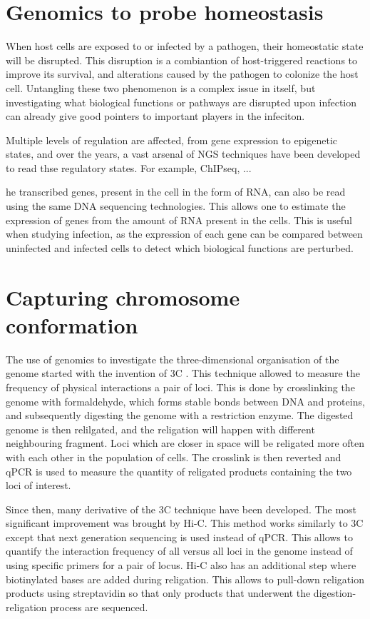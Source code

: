 \section{Genomics to probe homeostasis}

When host cells are exposed to or infected by a pathogen, their homeostatic state will be disrupted. This disruption is a combiantion of host-triggered reactions to improve its survival, and alterations caused by the pathogen to colonize the host cell. Untangling these two phenomenon is a complex issue in itself, but investigating what biological functions or pathways are disrupted upon infection can already give good  pointers to important players in the infeciton.

Multiple levels of regulation are affected, from gene expression to epigenetic states, and over the years, a vast arsenal of NGS techniques have been developed to read thse regulatory states. For example, ChIPseq, ...

he transcribed genes, present in the cell in the form of RNA, can also be read using the same DNA sequencing technologies. This allows one to estimate the expression of genes from the amount of RNA present in the cells. This is useful when studying infection, as the expression of each gene can be compared between uninfected and infected cells to detect which biological functions are perturbed.



\section{Capturing chromosome conformation}

The use of genomics to investigate the three-dimensional organisation of the genome started with the invention of \acrfull{3C} \cite{Dekker2002}. This technique allowed to measure the frequency of physical interactions a pair of loci. This is done by crosslinking the genome with formaldehyde, which forms stable bonds between DNA and proteins, and subsequently digesting the genome with a restriction enzyme. The digested genome is then relilgated, and the religation will happen with different neighbouring fragment. Loci which are closer in space will be religated more often with each other in the population of cells. The crosslink is then reverted and qPCR is used to measure the quantity of religated products containing the two loci of interest. 

Since then, many derivative of the \acrshort{3C} technique have been developed. The most significant improvement was brought by Hi-C. This method works similarly to 3C except that next generation sequencing is used instead of qPCR. This allows to quantify the interaction frequency of all versus all loci in the genome instead of using specific primers for a pair of locus. Hi-C also has an additional step where biotinylated bases are added during religation. This allows to pull-down religation products using streptavidin so that only products that underwent the digestion-religation process are sequenced.

